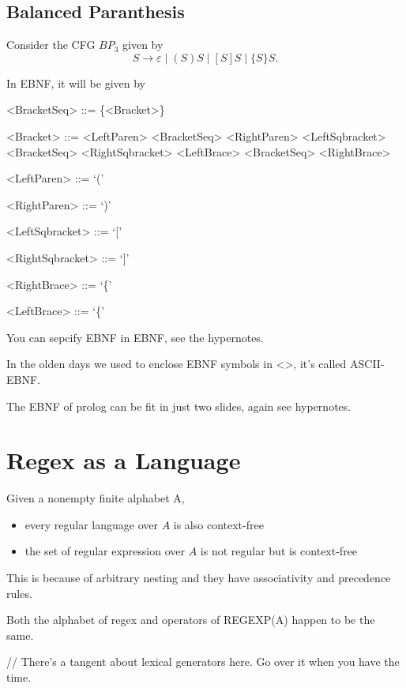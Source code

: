 \documentclass[a4paper]{scrartcl}
\theoremstyle{definition}
\newcommand{\eps}{\varepsilon}
\begin{document}
\subsection{Balanced Paranthesis}%
Consider the CFG $BP_3$ given by
\[S \to \eps \mid (S)S \mid [S]S \mid \{S\}S.\]

In EBNF, it will be given by
\setlength{\grammarindent}{10em}
\begin{grammar}
	<BracketSeq> ::= \{<Bracket>\}

	<Bracket> ::= <LeftParen> <BracketSeq> <RightParen>
	\alt <LeftSqbracket> <BracketSeq> <RightSqbracket>
	\alt <LeftBrace> <BracketSeq> <RightBrace>

	<LeftParen> ::= `('

	<RightParen> ::= `)'

	<LeftSqbracket> ::= `['

	<RightSqbracket> ::= `]'

	<RightBrace> ::= `\{'

	<LeftBrace> ::= `\{'
\end{grammar}
You can sepcify EBNF in EBNF, see the hypernotes.

In the olden days we used to enclose EBNF symbols in <>, it's called ASCII-EBNF.

The EBNF of prolog can be fit in just two slides, again see hypernotes.

\section{Regex as a Language}
Given a nonempty finite alphabet A,
\begin{itemize}
	\item every regular language over $A$ is also context-free
	\item the set of regular expression over $A$ is not regular but is context-free
\end{itemize}
This is because of arbitrary nesting and they have associativity and precedence rules.

Both the alphabet of regex and operators of REGEXP(A) happen to be the same.

// There's a tangent about lexical generators here. Go over it when you have the time.
\end{document}
